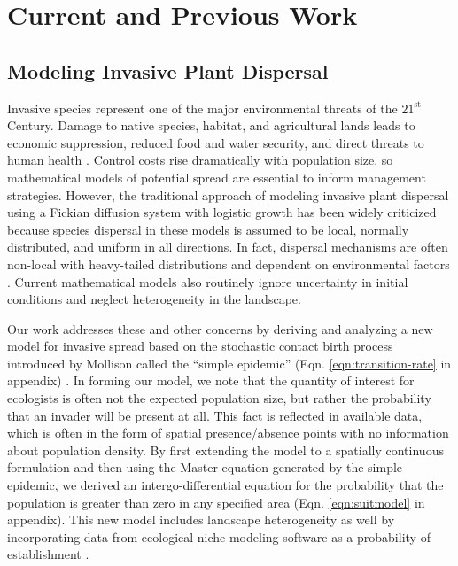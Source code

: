 \documentclass[11pt]{article}
\begin{document}

\section{Current and Previous Work}

\subsection{Modeling Invasive Plant Dispersal}

Invasive species represent one of the major environmental threats of the $21^{\mbox{st}}$ Century. Damage to native species, habitat, and agricultural lands leads to economic suppression, reduced food and water security, and direct threats to human health \cite{Keller09}. Control costs rise dramatically with population size, so mathematical models of potential spread are essential to inform management strategies. However, the traditional approach of modeling invasive plant dispersal using a Fickian diffusion system with logistic growth \cite{Maruvka06,Skellam51} has been widely criticized because species dispersal in these models is assumed to be local, normally distributed, and uniform in all directions. In fact, dispersal mechanisms are often non-local with heavy-tailed distributions and dependent on environmental factors \cite{Furter89}.  Current mathematical models also routinely ignore uncertainty in initial conditions and neglect heterogeneity in the landscape. %

Our work addresses these and other concerns by deriving and analyzing a new model for invasive spread based on the stochastic contact birth process introduced by Mollison called the ``simple epidemic'' (Eqn. \ref{eqn:transition-rate} in appendix) \cite{Mollison77}. In forming our model, we note that the quantity of interest for ecologists is often not the expected population size, but rather the probability that an invader will be present at all. This fact is reflected in available data, which is often in the form of spatial presence/absence points with no information about population density.
By first extending the model to a spatially continuous formulation and then using the Master equation generated by the simple epidemic, we derived an intergo-differential equation for the probability that the population is greater than zero in any specified area (Eqn. \ref{eqn:suitmodel} in appendix). This new model includes landscape heterogeneity as well by incorporating data from ecological niche modeling software as a probability of establishment \cite{Strickland14}.
\end{document}
